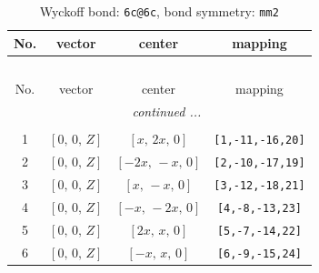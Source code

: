 \documentclass[fleqn,8pt]{jsarticle}
\begin{document}
\begin{longtable}{cccc}
\caption{Wyckoff bond: {\tt 6c@6c}, bond symmetry: {\tt mm2}}
 \\
 \hline \hline
No. & vector & center & mapping \\ \hline \endfirsthead

\multicolumn{3}{l}{\tablename\ \thetable{}} \\
 \hline \hline
No. & vector & center & mapping \\ \hline \endhead

 \hline \hline
\multicolumn{3}{r}{\footnotesize\it continued ...} \\ \endfoot

 \hline \hline
\multicolumn{3}{r}{} \\ \endlastfoot

1 & $\left[ 0,\, 0,\, Z \right]$ & $\left[ x,\, 2 x,\, 0 \right]$ & {\tt [1,-11,-16,20]} \\ \hline
2 & $\left[ 0,\, 0,\, Z \right]$ & $\left[ - 2 x,\, - x,\, 0 \right]$ & {\tt [2,-10,-17,19]} \\ \hline
3 & $\left[ 0,\, 0,\, Z \right]$ & $\left[ x,\, - x,\, 0 \right]$ & {\tt [3,-12,-18,21]} \\ \hline
4 & $\left[ 0,\, 0,\, Z \right]$ & $\left[ - x,\, - 2 x,\, 0 \right]$ & {\tt [4,-8,-13,23]} \\ \hline
5 & $\left[ 0,\, 0,\, Z \right]$ & $\left[ 2 x,\, x,\, 0 \right]$ & {\tt [5,-7,-14,22]} \\ \hline
6 & $\left[ 0,\, 0,\, Z \right]$ & $\left[ - x,\, x,\, 0 \right]$ & {\tt [6,-9,-15,24]} \\
\end{longtable}
\renewcommand{\arraystretch}{1.2}
\end{document}
